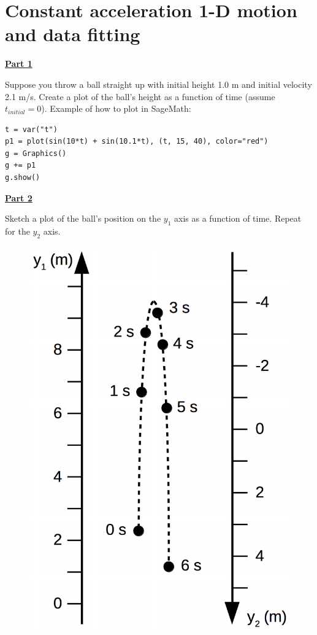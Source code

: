 \section{Constant acceleration 1-D motion and data fitting}

\underline{\textbf{Part 1}} \par
Suppose you throw a ball straight up with initial height 1.0 m and initial velocity 2.1 m/s.
Create a plot of the ball's height as a function of time (assume $t_{initial} = 0$).
\hfill \break
\hfill \break
Example of how to plot in SageMath:
\begin{verbatim}
t = var("t")
p1 = plot(sin(10*t) + sin(10.1*t), (t, 15, 40), color="red")
g = Graphics()
g += p1
g.show()
\end{verbatim}
\hfill \break \vspace{-4mm}

\underline{\textbf{Part 2}} \par
Sketch a plot of the ball's position on the $y_1$ axis as a function of time.
Repeat for the $y_2$ axis.
\begin{figure}[H]
\includegraphics[scale=0.4]{figures/fitting1Dmotion/twoAxisFreeFall.png}
\end{figure}

